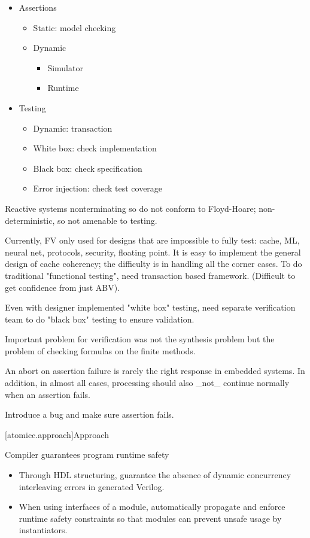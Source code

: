 \begin{itemize}

\item Assertions
\begin{itemize}
\item Static: model checking
\item Dynamic
\begin{itemize}
\item Simulator
\item Runtime
\end{itemize}
\end{itemize}

\item Testing
\begin{itemize}
\item Dynamic: transaction
\item White box: check implementation
\item Black box: check specification
\item Error injection: check test coverage
\end{itemize}

\end{itemize}

Reactive systems nonterminating so do not conform to Floyd-Hoare;
non-deterministic, so not amenable to testing.

Currently, FV only used for designs that are impossible to fully test: cache, ML, neural net,
protocols, security, floating point.
It is easy to implement the general design of cache coherency; the difficulty is in handling
all the corner cases.
To do traditional "functional testing", need transaction based framework.  (Difficult to
get confidence from just ABV).

Even with designer implemented "white box" testing, need separate verification team to
do "black box" testing to ensure validation.

Important problem for verification was not the synthesis problem but the
problem of checking formulas on the finite methods.

An abort on assertion failure is rarely the right response in embedded systems.
In addition, in almost all cases, processing should also _not_ continue normally
when an assertion fails.

Introduce a bug and make sure assertion fails.

[atomicc.approach]{Approach}

Compiler guarantees program runtime safety
\begin{itemize}
\item Through HDL structuring, guarantee the absence of dynamic concurrency interleaving errors in generated Verilog.
\item When using interfaces of a module, automatically propagate and enforce
runtime safety constraints so that modules can prevent unsafe usage by instantiators.
\end{itemize}

